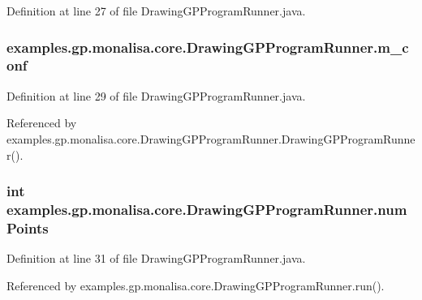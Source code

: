 Definition at line 27 of file Drawing\-G\-P\-Program\-Runner.\-java.

\hypertarget{classexamples_1_1gp_1_1monalisa_1_1core_1_1_drawing_g_p_program_runner_a62e7ecd2ebdc29cea148d9c7bc875157}{
\subsubsection[{m\-\_\-conf}]{ examples.\-gp.\-monalisa.\-core.\-Drawing\-G\-P\-Program\-Runner.\-m\-\_\-conf\hspace{0.3cm}{\ttfamily [private]}}}\label{classexamples_1_1gp_1_1monalisa_1_1core_1_1_drawing_g_p_program_runner_a62e7ecd2ebdc29cea148d9c7bc875157}


Definition at line 29 of file Drawing\-G\-P\-Program\-Runner.\-java.



Referenced by examples.\-gp.\-monalisa.\-core.\-Drawing\-G\-P\-Program\-Runner.\-Drawing\-G\-P\-Program\-Runner().

\hypertarget{classexamples_1_1gp_1_1monalisa_1_1core_1_1_drawing_g_p_program_runner_af9856578e2306dc0c6d37f5cf0c86040}{
\subsubsection[{num\-Points}]{\setlength{\rightskip}{0pt plus 5cm}int examples.\-gp.\-monalisa.\-core.\-Drawing\-G\-P\-Program\-Runner.\-num\-Points}}\label{classexamples_1_1gp_1_1monalisa_1_1core_1_1_drawing_g_p_program_runner_af9856578e2306dc0c6d37f5cf0c86040}


Definition at line 31 of file Drawing\-G\-P\-Program\-Runner.\-java.



Referenced by examples.\-gp.\-monalisa.\-core.\-Drawing\-G\-P\-Program\-Runner.\-run().

